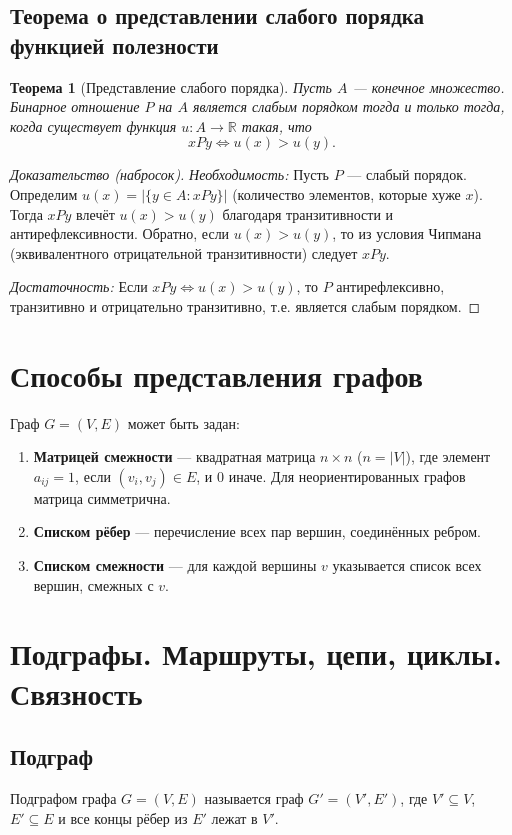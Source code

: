 \documentclass[12pt]{article}
\newtheorem{theorem}{Теорема}
\begin{document}
\begin{enumerate}
\subsection{Теорема о представлении слабого порядка функцией полезности}
\begin{theorem}[Представление слабого порядка]
    Пусть \(A\) — конечное множество. Бинарное отношение \(P\) на \(A\) является слабым порядком тогда и только тогда, когда существует функция \(u: A \to \mathbb{R}\) такая, что
    \[
    xPy \iff u(x) > u(y).
    \]
\end{theorem}
\begin{proof}[Доказательство (набросок)]
    \textit{Необходимость:} Пусть \(P\) — слабый порядок. Определим \(u(x) = |\{y \in A : xPy\}|\) (количество элементов, которые хуже \(x\)). Тогда \(xPy\) влечёт \(u(x) > u(y)\) благодаря транзитивности и антирефлексивности. Обратно, если \(u(x) > u(y)\), то из условия Чипмана (эквивалентного отрицательной транзитивности) следует \(xPy\).
    
    \textit{Достаточность:} Если \(xPy \iff u(x) > u(y)\), то \(P\) антирефлексивно, транзитивно и отрицательно транзитивно, т.е. является слабым порядком.
\end{proof}

\section{Способы представления графов}
Граф \(G = (V, E)\) может быть задан:
\begin{enumerate}
    \item \textbf{Матрицей смежности} — квадратная матрица \(n \times n\) (\(n = |V|\)), где элемент \(a_{ij} = 1\), если \((v_i, v_j) \in E\), и \(0\) иначе. Для неориентированных графов матрица симметрична.
    \item \textbf{Списком рёбер} — перечисление всех пар вершин, соединённых ребром.
    \item \textbf{Списком смежности} — для каждой вершины \(v\) указывается список всех вершин, смежных с \(v\).
\end{enumerate}

\section{Подграфы. Маршруты, цепи, циклы. Связность}
\subsection{Подграф}
Подграфом графа \(G = (V,E)\) называется граф \(G' = (V', E')\), где \(V' \subseteq V\), \(E' \subseteq E\) и все концы рёбер из \(E'\) лежат в \(V'\).


\end{enumerate}
\end{document}
